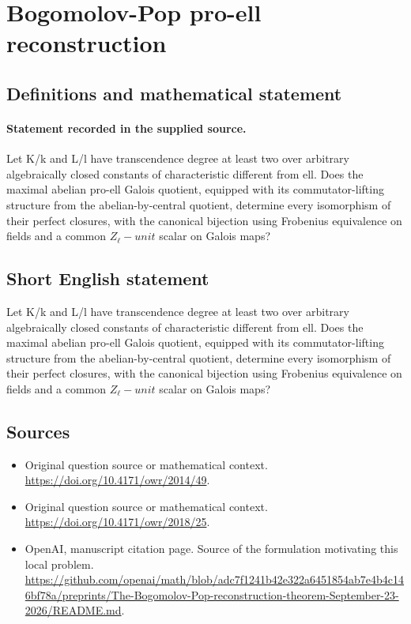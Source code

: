 \documentclass[11pt]{article}
\begin{document}
\section*{Bogomolov-Pop pro-ell reconstruction}\label{30007277}
\subsection{Definitions and mathematical statement}
\paragraph{Statement recorded in the supplied source.}
Let K/k and L/l have transcendence degree at least two over arbitrary algebraically closed constants of characteristic different from ell. Does the maximal abelian pro-ell Galois quotient, equipped with its commutator-lifting structure from the abelian-by-central quotient, determine every isomorphism of their perfect closures, with the canonical bijection using Frobenius equivalence on fields and a common $Z_\ell -unit$ scalar on Galois maps?
\subsection{Short English statement}
Let K/k and L/l have transcendence degree at least two over arbitrary algebraically closed constants of characteristic different from ell. Does the maximal abelian pro-ell Galois quotient, equipped with its commutator-lifting structure from the abelian-by-central quotient, determine every isomorphism of their perfect closures, with the canonical bijection using Frobenius equivalence on fields and a common $Z_\ell -unit$ scalar on Galois maps?
\subsection{Sources}
\begin{itemize}
\item[S1] Original question source or mathematical context.
\url{https://doi.org/10.4171/owr/2014/49}.
\item[S2] Original question source or mathematical context.
\url{https://doi.org/10.4171/owr/2018/25}.
\item[S3] OpenAI, manuscript citation page. Source of the formulation motivating this local problem.
\url{https://github.com/openai/math/blob/adc7f1241b42e322a6451854ab7e4b4c146bf78a/preprints/The-Bogomolov-Pop-reconstruction-theorem-September-23-2026/README.md}.
\end{itemize}
\end{document}
